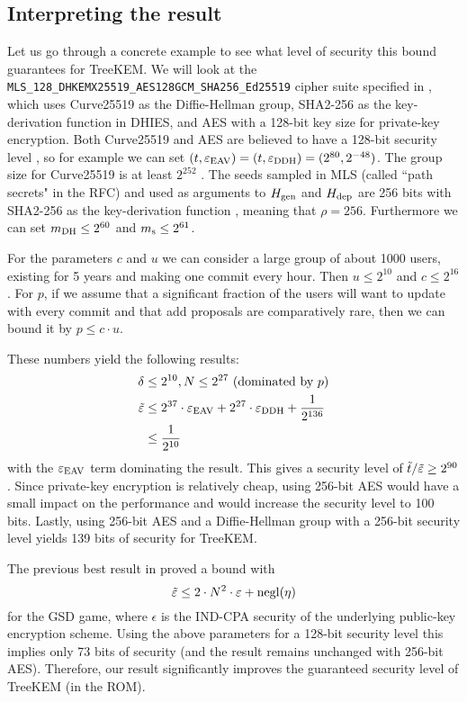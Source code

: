 \subsection{Interpreting the result}

Let us go through a concrete example to see what level of security this bound guarantees for TreeKEM. We will look at the \texttt{MLS\_128\_DHKEMX25519\_AES128GCM\_SHA256\_Ed25519} cipher suite specified in \cite[Section~17.1]{rfc9420}, which uses Curve25519 as the Diffie-Hellman group, SHA2-256 as the key-derivation function in DHIES, and AES with a 128-bit key size for private-key encryption. Both Curve25519 \cite{curve25519} and AES are believed to have a 128-bit security level , so for example we can set $(t, \varepsilon_\mathrm{EAV}) = (t, \varepsilon_\mathrm{DDH}) = (2^{80}, 2^{-48})$. The group size for Curve25519 is at least $2^{252}$ \cite{curve25519}. The seeds sampled in MLS (called ``path secrets" in the RFC) and used as arguments to $H_\mathrm{gen}$ and $H_\mathrm{dep}$ are 256 bits with SHA2-256 as the key-derivation function \cite{rfc9420}, meaning that $\rho = 256$. Furthermore we can set $m_\mathrm{DH} \le 2^{60}$ and $m_\mathrm{s} \le 2^{61}$.

For the parameters $c$ and $u$ we can consider a large group of about 1000 users, existing for 5 years and making one commit every hour. Then $u \le 2^{10}$ and $c \le 2^{16}$. For $p$, if we assume that a significant fraction of the users will want to update with every commit and that add proposals are comparatively rare, then we can bound it by $p \le c \cdot u$.

These numbers yield the following results:
\begin{align*}
	\delta & \le 2^{10}, N \le 2^{27}                                                      \text{ (dominated by $p$)} \\
	\tilde{\varepsilon}    & \le 2^{37} \cdot \varepsilon_\mathrm{EAV} + 2^{27} \cdot \varepsilon_\mathrm{DDH} + \frac{1}{2^{136}}                                          \\
	       & \le \frac{1}{2^{10}}
\end{align*}
with the $\varepsilon_\mathrm{EAV}$ term dominating the result. This gives a security level of $\tilde{t}/\tilde{\varepsilon} \ge 2^{90}$. Since private-key encryption is relatively cheap, using 256-bit AES would have a small impact on the performance and would increase the security level to 100 bits. Lastly, using 256-bit AES and a Diffie-Hellman group with a 256-bit security level yields 139 bits of security for TreeKEM.

The previous best result in \cite[Theorem 3]{ttkem} proved a bound with
\[
	\tilde{\varepsilon} \le 2 \cdot N^2 \cdot \varepsilon + \mathrm{negl}(\eta)
\]
for the GSD game, where $\epsilon$ is the IND-CPA security of the underlying public-key encryption scheme. Using the above parameters for a 128-bit security level this implies only 73 bits of security (and the result remains unchanged with 256-bit AES). Therefore, our result significantly improves the guaranteed security level of TreeKEM (in the ROM).
